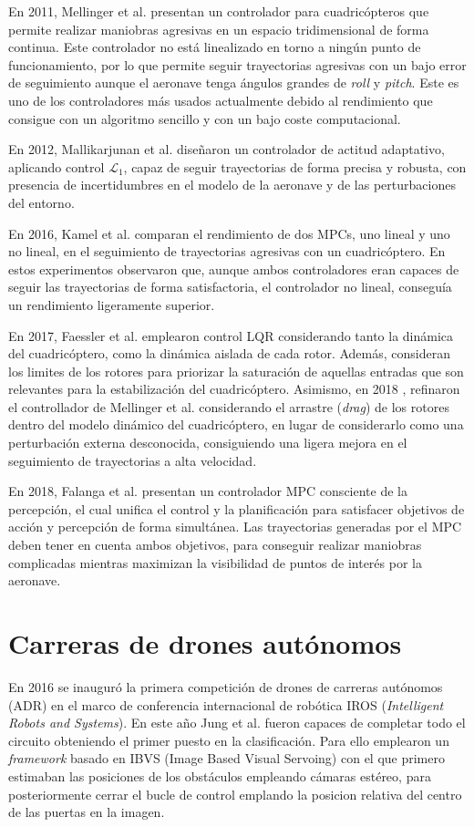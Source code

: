 En 2011, Mellinger et al. \cite{MinimunSnap2011} presentan un controlador para cuadricópteros que permite realizar maniobras agresivas en un espacio tridimensional de forma continua. Este controlador no está linealizado en torno a ningún punto de funcionamiento, por lo que permite seguir trayectorias agresivas con un bajo error de seguimiento aunque el aeronave tenga ángulos grandes de \textit{roll} y \textit{pitch}. Este es uno de los controladores más usados actualmente debido al rendimiento que consigue con un algoritmo sencillo y con un bajo coste computacional.

En 2012, Mallikarjunan et al. \cite{mallikarjunan2012l1} diseñaron un controlador de actitud adaptativo, aplicando control $\mathcal{L}_1$, capaz de seguir trayectorias de forma precisa y robusta, con presencia de incertidumbres en el modelo de la aeronave y de las perturbaciones del entorno.

En 2016, Kamel et al. \cite{KamelMPC2016} comparan el rendimiento de dos MPCs, uno lineal y uno no lineal, en el seguimiento de trayectorias agresivas con un cuadricóptero. En estos experimentos observaron que, aunque ambos controladores eran capaces de seguir las trayectorias de forma satisfactoria, el controlador no lineal, conseguía un rendimiento ligeramente superior.

En 2017, Faessler et al. \cite{Faessler17ral} emplearon control LQR considerando tanto la dinámica del cuadricóptero, como la dinámica aislada de cada rotor. Además, consideran los limites de los rotores para priorizar la saturación de aquellas entradas que son relevantes para la estabilización del cuadricóptero. Asimismo, en 2018 \cite{Faessler18ral}, refinaron el controllador de Mellinger et al. considerando el arrastre (\textit{drag}) de los rotores dentro del modelo dinámico del cuadricóptero, en lugar de considerarlo como una perturbación externa desconocida, consiguiendo una ligera mejora en el seguimiento de trayectorias a alta velocidad.
 
En 2018, Falanga et al. \cite{falanga2018pampc} presentan un controlador MPC consciente de la percepción, el cual unifica el control y la planificación para satisfacer objetivos de acción y percepción de forma simultánea. Las trayectorias generadas por el MPC deben tener en cuenta ambos objetivos, para conseguir realizar maniobras complicadas mientras maximizan la visibilidad de puntos de interés por la aeronave.


\section{Carreras de drones autónomos}
En 2016 se inauguró la primera competición de drones de carreras autónomos (ADR) en el marco de conferencia internacional de robótica IROS (\textit{Intelligent Robots and Systems}). En este año Jung et al.\cite{iros2016} fueron capaces de completar todo el circuito obteniendo el primer puesto en la clasificación. Para ello emplearon un \textit{framework} basado en IBVS (Image Based Visual Servoing) con el que primero estimaban las posiciones de los obstáculos empleando cámaras estéreo, para posteriormente cerrar el bucle de control emplando la posicion relativa del centro de las puertas en la imagen. 


